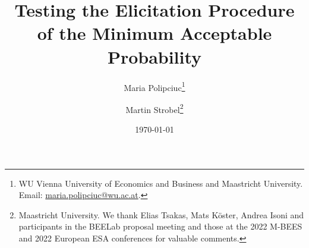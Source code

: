 
\title{Testing the Elicitation Procedure \\ of the Minimum Acceptable Probability}
\author{Maria Polipciuc\thanks{WU Vienna University of Economics and Business and Maastricht University. Email: \url{maria.polipciuc@wu.ac.at}.} \and Martin Strobel\thanks{Maastricht University. We thank Elias Tsakas, Mats K\"{o}ster, Andrea Isoni and participants in the BEELab proposal meeting and those at the 2022 M-BEES and 2022 European ESA conferences for valuable comments.}}
\date{\today	\vspace{1cm}}
\titlepage



\begin{titlepage}
\clearpage
\maketitle
\thispagestyle{empty}


\begin{abstract}
%
%


\end{abstract}
\end{titlepage}
